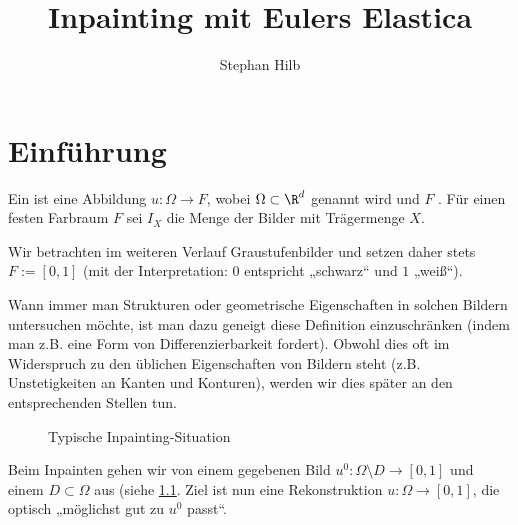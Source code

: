 \documentclass{mythesis}
\title{Inpainting mit Eulers Elastica}
\author{Stephan Hilb}
\begin{document}


\chapter{Einführung}

%
%

\begin{definition} \label{def:image}
    Ein  ist eine Abbildung $u: \Omega \to F$, wobei $\Omega \subset \R^d$
     genannt wird und $F$ .
    Für einen festen Farbraum $F$ sei $I_X$ die Menge der Bilder mit Trägermenge $X$.
    \begin{note}
	Wir betrachten im weiteren Verlauf Graustufenbilder und setzen daher stets $F := [0,1]$ (mit der
	Interpretation: $0$ entspricht „schwarz“ und $1$ „weiß“).
    \end{note}
\end{definition}

Wann immer man Strukturen oder geometrische Eigenschaften in solchen Bildern untersuchen möchte, ist man dazu geneigt diese Definition einzuschränken (indem man z.B. eine Form von Differenzierbarkeit fordert).
Obwohl dies oft im Widerspruch zu den üblichen Eigenschaften von Bildern steht (z.B. Unstetigkeiten an Kanten und Konturen), werden wir dies später an den entsprechenden Stellen tun.

\begin{figure}[ht]
    \centering
    \caption{Typische Inpainting-Situation}
    \label{fig:inpainting_setting}
\end{figure}

Beim Inpainten gehen wir von einem gegebenen Bild $u^0: \Omega \setminus D \to [0,1]$ und einem 
$D \subset \Omega$ aus (siehe \ref{fig:inpainting_setting}. Ziel ist nun eine Rekonstruktion $u: \Omega \to [0,1]$, die optisch „möglichst gut zu $u^0$ passt“.
\end{document}
